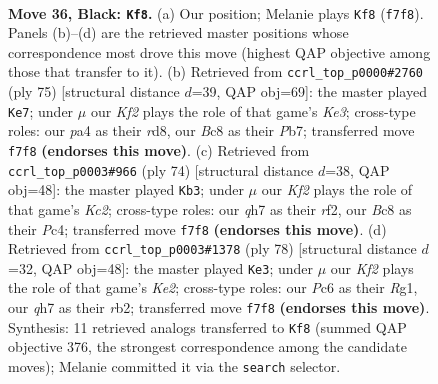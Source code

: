 \documentclass[11pt]{article}
\begin{document}
\clearpage

\begin{figure}[p]\centering
\begin{subfigure}{0.46\textwidth}\centering
\resizebox{\linewidth}{!}{%
\newchessgame
\chessboard[
  setfen={r1b5/5k1Q/2p1p3/p3P3/P4P2/q7/4K3/6N1 b - - 5 36},
  showmover=false,
  pgfstyle=straightmove, color=movearrow, markmove={f7-f8}
]}
\caption{}
\end{subfigure}\hfill
\begin{subfigure}{0.46\textwidth}\centering
\resizebox{\linewidth}{!}{%
\newchessgame
\chessboard[
  setfen={3R4/1p4N1/4kp2/p1b5/2P3P1/5K1P/1r6/8 b - - 3 38},
  showmover=false,
  pgfstyle=straightmove, color=movearrow, markmove={e6-e7}
]}
\caption{}
\end{subfigure}
\\[4pt]
\begin{subfigure}{0.46\textwidth}\centering
\resizebox{\linewidth}{!}{%
\newchessgame
\chessboard[
  setfen={6k1/6p1/1R6/p1p4P/P1Pp4/8/1PK2r2/8 w - - 3 38},
  showmover=false,
  pgfstyle=straightmove, color=movearrow, markmove={c2-b3}
]}
\caption{}
\end{subfigure}\hfill
\begin{subfigure}{0.46\textwidth}\centering
\resizebox{\linewidth}{!}{%
\newchessgame
\chessboard[
  setfen={8/B7/4k1p1/b6p/4p3/2P4P/1r2KPP1/6R1 w - - 1 40},
  showmover=false,
  pgfstyle=straightmove, color=movearrow, markmove={e2-e3}
]}
\caption{}
\end{subfigure}
\caption{\textbf{Move 36, Black: \texttt{Kf8}.} (a) Our position; Melanie plays \texttt{Kf8} (\texttt{f7f8}). Panels (b)--(d) are the retrieved master positions whose correspondence most drove this move (highest QAP objective among those that transfer to it). (b) Retrieved from \texttt{ccrl\_top\_p0000\#2760} (ply 75) [structural distance $d$=39, QAP obj=69]: the master played \texttt{Ke7}; under $\mu$ our \emph{Kf2} plays the role of that game's \emph{Ke3}; cross-type roles: our \emph{p}a4 as their \emph{r}d8, our \emph{B}c8 as their \emph{P}b7; transferred move \texttt{f7f8} \textbf{(endorses this move)}. (c) Retrieved from \texttt{ccrl\_top\_p0003\#966} (ply 74) [structural distance $d$=38, QAP obj=48]: the master played \texttt{Kb3}; under $\mu$ our \emph{Kf2} plays the role of that game's \emph{Kc2}; cross-type roles: our \emph{q}h7 as their \emph{r}f2, our \emph{B}c8 as their \emph{P}c4; transferred move \texttt{f7f8} \textbf{(endorses this move)}. (d) Retrieved from \texttt{ccrl\_top\_p0003\#1378} (ply 78) [structural distance $d$=32, QAP obj=48]: the master played \texttt{Ke3}; under $\mu$ our \emph{Kf2} plays the role of that game's \emph{Ke2}; cross-type roles: our \emph{P}c6 as their \emph{R}g1, our \emph{q}h7 as their \emph{r}b2; transferred move \texttt{f7f8} \textbf{(endorses this move)}. Synthesis: 11 retrieved analogs transferred to \texttt{Kf8} (summed QAP objective 376, the strongest correspondence among the candidate moves); Melanie committed it via the \texttt{search} selector.}
\label{fig:thought-m71}
\end{figure}
\end{document}
